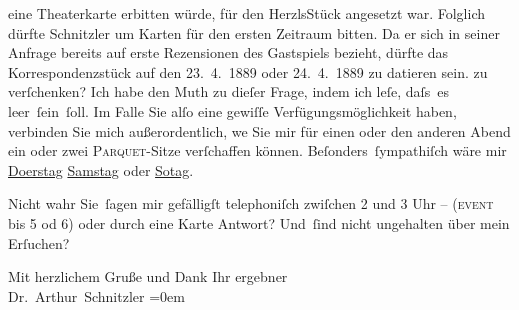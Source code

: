 {{{                  eine Theaterkarte erbitten würde, für den HerzlsStück angesetzt war. Folglich dürfte Schnitzler 
                  um Karten für den ersten Zeitraum bitten. Da er sich in seiner Anfrage bereits auf erste Rezensionen
                  des Gastspiels bezieht, dürfte das Korrespondenzstück auf den 23. 4. 1889 oder
                  24. 4. 1889 zu datieren sein.}}}\label{K_L03917-1} zu
               verſchenken? Ich habe den Muth zu dieſer Frage, indem ich leſe, daſs es
               leer ſein ſoll. Im Falle Sie alſo eine gewiſſe Verfügungsmöglichkeit haben, verbinden
                  {\pb}Sie mich außerordentlich, we{\geminationn} Sie mir für einen oder
               den anderen Abend ein oder zwei \introOben{}\textsc{Parquet-}\introOben{}Sitze verſchaffen können. Beſonders ſympathiſch wäre mir \uline{Do{\geminationn}erstag}{ }\uline{Samstag} oder \uline{So{\geminationn}tag}.\pend
           
\pstart
           Nicht wahr Sie ſagen mir gefälligſt telephoniſch zwiſchen 2 und 3 Uhr \introOben{}–
                  (\textsc{event} bis 5 od 6)\introOben{} oder durch eine Karte Antwort? Und ſind nicht ungehalten
               über mein Erſuchen?\pend
           
\pstart
           Mit herzlichem Gruße und Dank Ihr ergebner{\\[\baselineskip]}\spacefill\mbox{Dr. Arthur Schnitzler}\pend
           \leftskip=0em{}\endnumbering{}  \newcommand{\dateiname}{L03917}\newcommand{\titel}{Arthur Schnitzler an Theodor Herzl, [23. oder 24. 4. 1889?]}\newcommand{\editorInnen}{Herausgegeben von Jahnke, SelmaMüller, Martin Anton}
